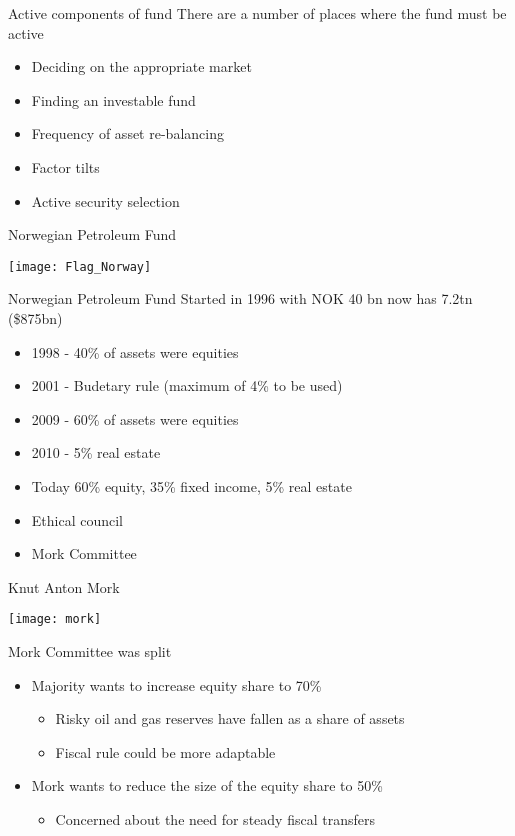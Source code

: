 \documentclass[14pt,xcolor=pdftex,dvipsnames,table]{beamer}\usepackage[]{graphicx}\usepackage[]{color}
\begin{document}
\begin{frame}{Active components of fund}
There are a number of places where the fund must be active
\begin{itemize}[<+-| alert@+>]
\pause
\item Deciding on the appropriate market
\item Finding an investable fund
\item Frequency of asset re-balancing
\item Factor tilts
\item Active security selection
\end{itemize}
\end{frame}

\begin{frame}{Norwegian Petroleum Fund}
\begin{center}
\texttt{[image: Flag\_Norway]}
\end{center}
\end{frame}

\begin{frame}{Norwegian Petroleum Fund}
Started in 1996 with NOK 40 bn now has 7.2tn (\$875bn) 
\begin{itemize}[<+-| alert@+>]
\pause
\item 1998 - 40\% of assets were equities
\item 2001 - Budetary rule (maximum of 4\% to be used)
\item 2009 - 60\% of assets were equities
\item 2010 - 5\% real estate
\item Today 60\% equity, 35\% fixed income, 5\% real estate
\item Ethical council 
\item Mork Committee
\end{itemize}
\end{frame}

\begin{frame}{Knut Anton Mork}
\begin{center}
\texttt{[image: mork]}
\end{center}
\end{frame}

\begin{frame}{Mork}
Committee was split
\begin{itemize}[<+-| alert@+>]
\pause
\item Majority wants to increase equity share to 70\%
\begin{itemize}
\item Risky oil and gas reserves have fallen as a share of assets
\item Fiscal rule could be more adaptable
\end{itemize}
\item Mork wants to reduce the size of the equity share to 50\%
\begin{itemize}
\item Concerned about the need for steady fiscal transfers
\end{itemize}
\end{itemize}
\end{frame}
\end{document}
